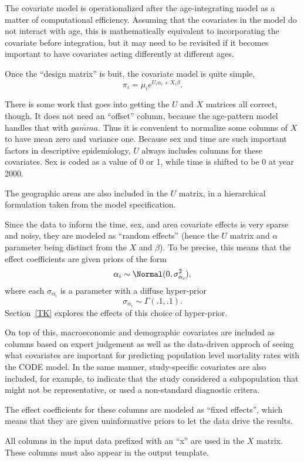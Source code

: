 The covariate model is operationalized after the age-integrating model
as a matter of computational efficiency.  Assuming that the covariates
in the model do not interact with age, this is mathematically
equivalent to incorporating the covariate before integration, but it
may need to be revisited if it becomes important to have covariates
acting differently at different ages.

Once the ``design matrix'' is buit, the covariate model is quite simple,
\[
\pi_i = \mu_i e^{U_i\alpha_i + X_i\beta}.
\]

There is some work that goes into getting the $U$ and $X$ matrices all
correct, though.  It does not need an ``offset'' column, because the
age-pattern model handles that with $\bar{gamma}$.  Thus it is
convenient to normalize some columns of $X$ to have mean zero
and variance one.  Because sex and time are such important factors in
descriptive epidemiology, $U$ always includes columns for these
covariates.  Sex is coded as a value of 0 or 1, while time is shifted
to be 0 at year 2000.

The geographic areas are also included in the $U$ matrix, in a
hierarchical formulation taken from the model specification.

Since the data to inform the time, sex, and area covariate effects is
very sparse and noisy, they are modeled as ``random effects'' (hence
the $U$ matrix and $\alpha$ parameter being distinct from the $X$ and
$\beta$).  To be precise, this means that the effect coefficients are given priors of
the form
\[
\alpha_i \sim \Normal(0, \sigma_{\alpha_i}^2),
\]
where each $\sigma_{\alpha_i}$ is a parameter with a diffuse hyper-prior
\[
\sigma_{\alpha_i} \sim \Gamma(.1, .1).
\]
Section~\ref{TK} explores the effects of this choice of hyper-prior.


On top of this, macroeconomic and demographic covariates are included
as columns based on expert judgement as well as the data-driven
approch of seeing what covariates are important for predicting
population level mortality rates with the CODE model. In the same
manner, study-specific covariates are also included, for example, to
indicate that the study considered a subpopulation that might not be
representative, or used a non-standard diagnostic critera.

The effect coefficients for these columns are modeled as ``fixed
effects'', which means that they are given uninformative priors to let
the data drive the results.

All columns in the input data prefixed with an ``x'' are used in the
$X$ matrix.  These columns must also appear in the output template.

